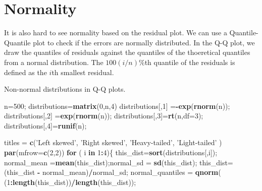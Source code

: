 \documentclass[12pt,]{book}
\newenvironment{Shaded}{\begin{snugshade}}{\end{snugshade}}
\newcommand{\KeywordTok}[1]{\textcolor[rgb]{0.13,0.29,0.53}{\textbf{#1}}}
\newcommand{\DataTypeTok}[1]{\textcolor[rgb]{0.13,0.29,0.53}{#1}}
\newcommand{\DecValTok}[1]{\textcolor[rgb]{0.00,0.00,0.81}{#1}}
\newcommand{\StringTok}[1]{\textcolor[rgb]{0.31,0.60,0.02}{#1}}
\newcommand{\ControlFlowTok}[1]{\textcolor[rgb]{0.13,0.29,0.53}{\textbf{#1}}}
\newcommand{\OperatorTok}[1]{\textcolor[rgb]{0.81,0.36,0.00}{\textbf{#1}}}
\newcommand{\NormalTok}[1]{#1}
\begin{document}
\section{Normality}\label{normality}

It is also hard to see normality based on the residual plot. We can use
a Quantile-Quantile plot to check if the errors are normally
distributed. In the Q-Q plot, we draw the quantiles of residuals against
the quantiles of the thoeretical quantiles from a normal distribution.
The \(100(i/n)\%\)th quantile of the residuals is defined as the \(i\)th
smallest residual.

Non-normal distributions in Q-Q plots.

\begin{Shaded}
\begin{Highlighting}[]
\NormalTok{n=}\DecValTok{500}\NormalTok{;}
\NormalTok{distributions=}\KeywordTok{matrix}\NormalTok{(}\DecValTok{0}\NormalTok{,n,}\DecValTok{4}\NormalTok{)}
\NormalTok{distributions[,}\DecValTok{1}\NormalTok{] =}\OperatorTok{-}\KeywordTok{exp}\NormalTok{(}\KeywordTok{rnorm}\NormalTok{(n));}
\NormalTok{distributions[,}\DecValTok{2}\NormalTok{] =}\KeywordTok{exp}\NormalTok{(}\KeywordTok{rnorm}\NormalTok{(n));}
\NormalTok{distributions[,}\DecValTok{3}\NormalTok{]=}\KeywordTok{rt}\NormalTok{(n,}\DataTypeTok{df=}\DecValTok{3}\NormalTok{);}
\NormalTok{distributions[,}\DecValTok{4}\NormalTok{]=}\KeywordTok{runif}\NormalTok{(n);}

\NormalTok{titles =}\StringTok{ }\KeywordTok{c}\NormalTok{(}\StringTok{'Left skewed'}\NormalTok{, }\StringTok{'Right skewed'}\NormalTok{, }\StringTok{'Heavy-tailed'}\NormalTok{, }\StringTok{'Light-tailed'}\NormalTok{ )}
\KeywordTok{par}\NormalTok{(}\DataTypeTok{mfrow=}\KeywordTok{c}\NormalTok{(}\DecValTok{2}\NormalTok{,}\DecValTok{2}\NormalTok{))}
\ControlFlowTok{for}\NormalTok{ ( i }\ControlFlowTok{in} \DecValTok{1}\OperatorTok{:}\DecValTok{4}\NormalTok{)\{}
\NormalTok{this_dist=}\KeywordTok{sort}\NormalTok{(distributions[,i]);}
\NormalTok{normal_mean =}\KeywordTok{mean}\NormalTok{(this_dist);normal_sd =}\StringTok{ }\KeywordTok{sd}\NormalTok{(this_dist);}
\NormalTok{this_dist=(this_dist }\OperatorTok{-}\StringTok{ }\NormalTok{normal_mean)}\OperatorTok{/}\NormalTok{normal_sd;}
\NormalTok{normal_quantiles =}\StringTok{ }\KeywordTok{qnorm}\NormalTok{( (}\DecValTok{1}\OperatorTok{:}\KeywordTok{length}\NormalTok{(this_dist))}\OperatorTok{/}\KeywordTok{length}\NormalTok{(this_dist));}


\end{Highlighting}
\end{Shaded}
\end{document}
